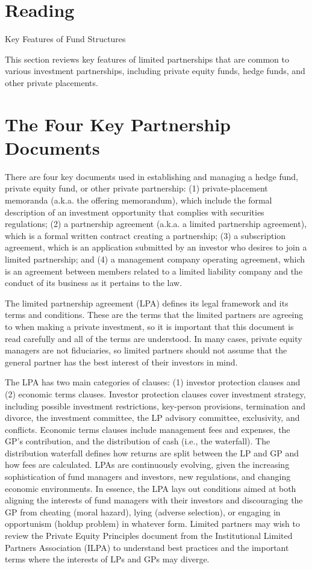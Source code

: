 \documentclass[11pt]{article}
\begin{document}
\section*{Reading}
Key Features of Fund Structures

This section reviews key features of limited partnerships that are common to various investment partnerships, including private equity funds, hedge funds, and other private placements.

\section*{The Four Key Partnership Documents}
There are four key documents used in establishing and managing a hedge fund, private equity fund, or other private partnership: (1) private-placement memoranda (a.k.a. the offering memorandum), which include the formal description of an investment opportunity that complies with securities regulations; (2) a partnership agreement (a.k.a. a limited partnership agreement), which is a formal written contract creating a partnership; (3) a subscription agreement, which is an application submitted by an investor who desires to join a limited partnership; and (4) a management company operating agreement, which is an agreement between members related to a limited liability company and the conduct of its business as it pertains to the law.

The limited partnership agreement (LPA) defines its legal framework and its terms and conditions. These are the terms that the limited partners are agreeing to when making a private investment, so it is important that this document is read carefully and all of the terms are understood. In many cases, private equity managers are not fiduciaries, so limited partners should not assume that the general partner has the best interest of their investors in mind.

The LPA has two main categories of clauses: (1) investor protection clauses and (2) economic terms clauses. Investor protection clauses cover investment strategy, including possible investment restrictions, key-person provisions, termination and divorce, the investment committee, the LP advisory committee, exclusivity, and conflicts. Economic terms clauses include management fees and expenses, the GP's contribution, and the distribution of cash (i.e., the waterfall). The distribution waterfall defines how returns are split between the LP and GP and how fees are calculated. LPAs are continuously evolving, given the increasing sophistication of fund managers and investors, new regulations, and changing economic environments. In essence, the LPA lays out conditions aimed at both aligning the interests of fund managers with their investors and discouraging the GP from cheating (moral hazard), lying (adverse selection), or engaging in opportunism (holdup problem) in whatever form. Limited partners may wish to review the Private Equity Principles document from the Institutional Limited Partners Association (ILPA) to understand best practices and the important terms where the interests of LPs and GPs may diverge.
\end{document}
